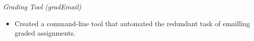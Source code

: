 {\sl Grading Tool (gradEmail)}
\begin{itemize} \itemsep -2pt %
  \item Created a command-line tool that automated the redundant task of emailling graded assignments.
\end{itemize}
